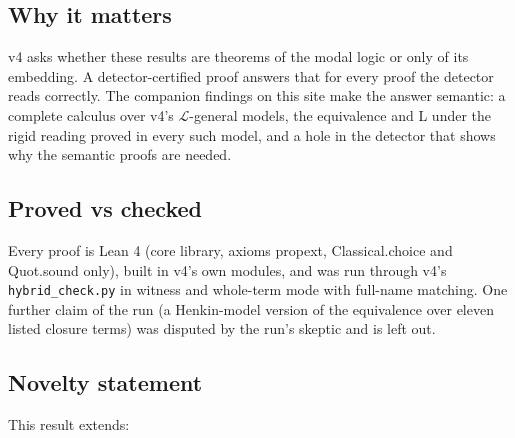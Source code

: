 \documentclass{article}
\begin{document}
\subsection*{Why it matters}

v4 asks whether these results are theorems of the modal logic or only of its embedding. A
detector-certified proof answers that for every proof the detector reads correctly. The
companion findings on this site make the answer semantic: a complete calculus over v4's
$\mathcal L$-general models, the equivalence and L under the rigid reading proved in every such
model, and a hole in the detector that shows why the semantic proofs are needed.

\subsection*{Proved vs checked}

Every proof is Lean 4 (core library, axioms propext, Classical.choice and Quot.sound only),
built in v4's own modules, and was run through v4's \texttt{hybrid\_check.py} in witness and whole-term
mode with full-name matching. One further claim of the run (a Henkin-model version of the
equivalence over eleven listed closure terms) was disputed by the run's skeptic and is left out.

\subsection*{Novelty statement}

This result extends:
\end{document}
